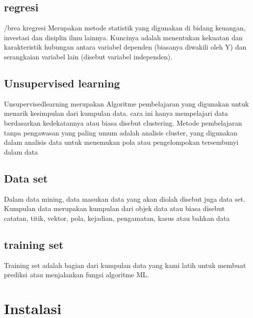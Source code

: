 \documentclass{article}
\begin{document}
\subsection{regresi}
\hfill/brea kregresi Merupakan metode statistik yang digunakan di bidang keuangan, investasi dan disiplin ilmu lainnya. Kuncinya adalah menentukan kekuatan dan karakteristik hubungan antara variabel dependen (biasanya diwakili oleh Y) dan serangkaian variabel lain (disebut variabel independen).
\subsection{Unsupervised learning}
\hfill\break Unsupervisedlearning merupakan Algoritme pembelajaran yang digunakan untuk menarik kesimpulan dari kumpulan data. cara ini hanya mempelajari data berdasarkan kedekatannya atau biasa disebut clustering. Metode pembelajaran tanpa pengawasan yang paling umum adalah analisis cluster, yang digunakan dalam analisis data untuk menemukan pola atau pengelompokan tersembunyi dalam data

\subsection{Data set}
\hfill\break Dalam data mining, data masukan data yang akan diolah disebut juga data set. Kumpulan data merupakan kumpulan dari objek data atau biasa disebut catatan, titik, vektor, pola, kejadian, pengamatan, kasus atau bahkan data
\subsection{training set}
\hfill\break Training set adalah bagian dari kumpulan data yang kami latih untuk membuat prediksi atau menjalankan fungsi algoritme ML.

\section{Instalasi}
\end{document}
